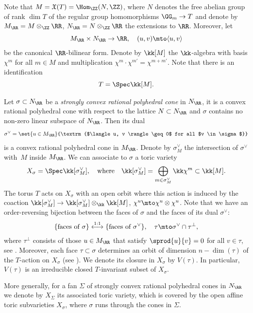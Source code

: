 Note that $M = \mathfrak{X}(T) = \Hom_\ZZ(N, \ZZ)$, where $N$ denotes the free abelian group of rank
$\dim T$ of the regular group homomorphisms $\GG_m \to T$
and denote by $M_{\RR} = M \otimes_{\ZZ} \RR$, $N_{\RR} = N \otimes_{\ZZ} \RR$ the extensions to $\RR$.
Moreover, let
\[
M_{\RR} \times N_{\RR} \to \RR, \quad
(u, v) \mto \langle u, v \rangle
\]
be the canonical $\RR$-bilinear form. Denote by $\kk[M]$ the $\kk$-algebra with basis $\chi^m$ for all $m \in M$
and multiplication $\chi^m \cdot \chi^{m'} = \chi^{m+m'}$. Note that there is an identification
\[
T = \Spec \kk[M].
\]

Let $\sigma \subset N_{\RR}$ be a \emph{strongly convex rational
polyhedral cone} in $N_{\RR}$, \ie it is a convex rational polyhedral cone with respect to the lattice $N \subset N_{\RR}$ and $\sigma$ contains no non-zero linear subspace of $N_\RR$. Then its dual
\[
\sigma^\vee = \set{u \in M_{\RR}}{\textrm{$\langle u, v \rangle \geq 0$ for all $v \in \sigma$}}
\]
is a convex rational polyhedral cone in $M_\RR$.
Denote by $\sigma_M^\vee$ the intersection of $\sigma^\vee$ with~$M$ inside $M_{\RR}$.
We can associate to $\sigma$ a toric variety
\[
X_\sigma = \Spec \kk[\sigma_M^\vee], \quad \textrm{where} \quad
\kk[\sigma_M^\vee] = \bigoplus_{m \in \sigma_M^\vee} \kk \chi^m \subset \kk[M].
\]
The torus $T$ acts on $X_{\sigma}$ with an open orbit where this action is induced by the
coaction
$\kk[\sigma_M^\vee] \to \kk[\sigma_M^\vee] \otimes_{\kk} \kk[M]$,
$\chi^u \mto \chi^u \otimes \chi^u$. Note that we have an order-reversing
bijection between the faces of $\sigma$ and the faces of its dual $\sigma^\vee$:
\[
\{\textrm{faces of $\sigma$}\} \stackrel{1:1}{\longleftrightarrow}
\{\textrm{faces of $\sigma^\vee$}\}, \quad
\tau \mto \sigma^\vee \cap \tau^{\bot},
\]
where $\tau^\bot$ consists of those $u \in M_\RR$ that satisfy $\sprod{u}{v} = 0$ for all $v \in \tau$,
see \cite[Propty\,(10), p.\,12]{Fu1993Introduction-to-to}. Moreover, each face $\tau \subset \sigma$
determines an orbit of dimension \hbox{$n - \dim(\tau)$} of the $T$-action on $X_\sigma$ (see \cite[\S3.1]{Fu1993Introduction-to-to}).
We denote its closure in $X_\sigma$ by $V(\tau)$. In particular, $V(\tau)$ is an irreducible closed
$T$-invariant subset of $X_{\sigma}$.

More generally, for a fan $\Sigma$ of strongly convex rational polyhedral
cones in $N_{\RR}$ we denote by $X_\Sigma$ its
associated toric variety, which is covered by the open affine toric subvarieties $X_{\sigma}$,
where $\sigma$ runs through the cones in $\Sigma$.

